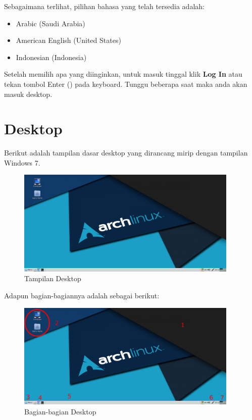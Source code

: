 \documentclass[12pt,]{article}
\begin{document}
	Sebagaimana terlihat, pilihan bahasa yang telah tersedia adalah:

	\begin{itemize}
		\item Arabic (Saudi Arabia)
		\item American English (United States)
		\item Indonesian (Indonesia)
	\end{itemize}

	Setelah memilih apa yang diinginkan, untuk masuk tinggal klik \textbf{Log In} atau tekan tombol Enter (\keys{\return}) pada keyboard.
	Tunggu beberapa saat maka anda akan masuk desktop.

	\newpage

	\section{Desktop}

	Berikut adalah tampilan dasar desktop yang dirancang mirip dengan tampilan Windows 7.

	\begin{figure}[h]
		\centering
		\includegraphics[width=300pt]{png/desktop}
		\caption{Tampilan Desktop}
	\end{figure}

	Adapun bagian-bagiannya adalah sebagai berikut:

	\begin{figure}[h]
		\centering
		\includegraphics[width=300pt]{png/desktop_part}
		\caption{Bagian-bagian Desktop}
	\end{figure}
\end{document}
